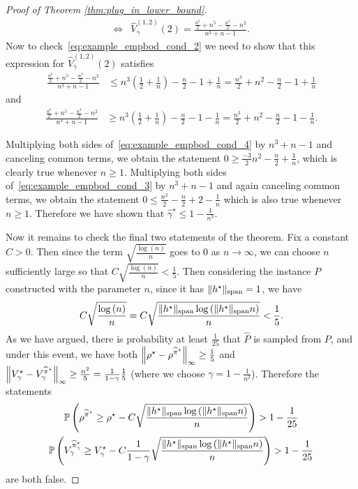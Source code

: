 \documentclass{article}
\theoremstyle{plain}
\theoremstyle{plain}
\theoremstyle{remark}
\theoremstyle{plain}
\theoremstyle{plain}
\renewcommand{\P}{\mathbb{P}}
\newcommand{\Phat}{\widehat{P}}
\newcommand{\Vhat}{\widehat{V}}
\newcommand{\pihstar}{\widehat{\pi}^\star}
\newcommand{\gammared}{{\overline{\gamma}}}
\newcommand{\empbod}{\widehat{\gamma}^\star}
\begin{document}
\begin{proof}[Proof of Theorem \ref{thm:plug_in_lower_bound}]
\begin{align*}
    \iff & \Vhat_{\gammared}^{(1,2)}(2) = \frac{\frac{n^6}{2} + n^5 - \frac{n^3}{2} - n^2}{n^3 + n - 1}.
\end{align*}
Now to check~\eqref{eq:example_empbod_cond_2} we need to show that this expression for $\Vhat_{\gammared}^{(1,2)}(2)$ satisfies
\begin{align}
    \frac{\frac{n^6}{2} + n^5 - \frac{n^3}{2} - n^2}{n^3 + n - 1} & \leq n^3 \left(\frac{1}{2} + \frac{1}{n} \right) - \frac{n}{2} - 1 + \frac{1}{n}= \frac{n^3}{2} + n^2 - \frac{n}{2} - 1 + \frac{1}{n}\label{eq:example_empbod_cond_3}
\end{align}
and
\begin{align}
    \frac{\frac{n^6}{2} + n^5 - \frac{n^3}{2} - n^2}{n^3 + n - 1} & \geq n^3 \left(\frac{1}{2} + \frac{1}{n} \right) - \frac{n}{2} - 1 -  \frac{1}{n} = \frac{n^3}{2} + n^2 - \frac{n}{2} - 1 -  \frac{1}{n}.\label{eq:example_empbod_cond_4}
\end{align}

Multiplying both sides of~\eqref{eq:example_empbod_cond_4} by $n^3 + n - 1$ and canceling common terms, we obtain the statement $0 \geq \frac{-3}{2}n^2 - \frac{n}{2} + \frac{1}{n}$, which is clearly true whenever $n \geq 1$. Multiplying both sides of~\eqref{eq:example_empbod_cond_3} by $n^3 + n - 1$ and again canceling common terms, we obtain the statement $0 \leq \frac{n^2}{2} - \frac{n}{2} + 2 - \frac{1}{n}$ which is also true whenever $n \geq 1$. Therefore we have shown that $\empbod \leq 1 - \frac{1}{n^3}$.



Now it remains to check the final two statements of the theorem. Fix a constant $C > 0$. Then since the term $\sqrt{\frac{ \log\left( n \right)}{n}}$ goes to $0$ as $n \to \infty$, we can choose $n $ sufficiently large so that $C\sqrt{\frac{ \log\left( n \right)}{n}} < \frac{1}{5}$. Then considering the instance $P$ constructed with the parameter $n$, since it has $\Vert h^\star\Vert _{\textnormal{span}} = 1$, we have
\[
C\sqrt{\frac{ \log\left( n \right)}{n}} = C \sqrt{\frac{\Vert h^\star\Vert _{\textnormal{span}} \log\left(\Vert h^\star\Vert _{\textnormal{span}} n \right)}{n}} < \frac{1}{5}.
\]
As we have argued, there is probability at least $\frac{1}{25}$ that $\Phat$ is sampled from $P$, and under this event, we have both $\infnorm{\rho^\star - \rho^{\pihstar}} \geq  \frac{1}{5}$ and $\infnorm{V_\gamma^\star - V_\gamma^{\pihstar}} \geq \frac{n^2}{5} = \frac{1}{1-\gamma}\frac{1}{5}$ (where we choose $\gamma = 1 - \frac{1}{n^2}$). Therefore the statements
\begin{gather*}
    \P \left( \rho^{\pihstar} \geq \rho^\star - C \sqrt{\frac{\spannorm{h^\star} \log\left(\spannorm{h^\star} n \right)}{n}} \right) > 1 - \frac{1}{25} \\
    \P \left( V_\gamma^{\pihstar_\gamma} \geq V_\gamma^{\star} - C \frac{1}{1-\gamma}\sqrt{\frac{\spannorm{h^\star} \log\left(\spannorm{h^\star} n \right)}{n}} \right) > 1 - \frac{1}{25}
\end{gather*}
are both false.
\end{proof}
\end{document}
